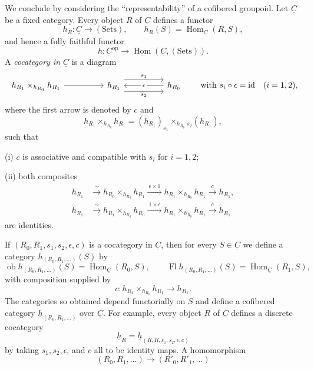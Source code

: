 We conclude by considering the ``representability'' of a cofibered
groupoid. Let $\underline C$ be a fixed category. Every object $R$ of
$\underline C$ defines a functor
\[
 h_R:\underline C\longrightarrow(\mathrm{Sets}),
 \qquad h_R(S)=\operatorname{Hom}_{\underline C}(R,S),
\]
and hence a fully faithful functor
\[
 h:\underline C^{\mathrm{op}}
 \longrightarrow
 \underline{\operatorname{Hom}}(\underline C,(\mathrm{Sets})).
\]
A \emph{cocategory in $\underline C$} is a diagram
\[
\begin{tikzcd}[column sep=huge]
 h_{R_1}\times_{h_{R_0}}h_{R_1} \arrow[r]
 & h_{R_1}
   \arrow[r,shift left=3,"{s_1}"]
   \arrow[r,shift right=3,"{s_2}"']
 & h_{R_0} \arrow[l,"{\epsilon}" description]
\end{tikzcd}
\qquad
\text{with }s_i\circ\epsilon=\operatorname{id}\quad(i=1,2),
\]
where the first arrow is denoted by $c$ and
\[
 h_{R_1}\times_{h_{R_0}}h_{R_1}
 = (h_{R_1})_{s_1}\times_{h_{R_0}}{}_{s_2}(h_{R_1}),
\]
such that

(i) $c$ is associative and compatible with $s_i$ for $i=1,2$;

(ii) both composites
\begin{align*}
 h_{R_1}&\xrightarrow{\ \sim\ }
 h_{R_0}\times_{h_{R_0}}h_{R_1}
 \xrightarrow{\ \epsilon\times1\ }
 h_{R_1}\times_{h_{R_0}}h_{R_1}
 \xrightarrow{\ c\ }h_{R_1},\\[1ex]
 h_{R_1}&\xrightarrow{\ \sim\ }
 h_{R_1}\times_{h_{R_0}}h_{R_0}
 \xrightarrow{\ 1\times\epsilon\ }
 h_{R_1}\times_{h_{R_0}}h_{R_1}
 \xrightarrow{\ c\ }h_{R_1}
\end{align*}
are identities.

If $(R_0,R_1,s_1,s_2,\epsilon,c)$ is a cocategory in
$\underline C$, then for every $S\in\underline C$ we define a
category $h_{(R_0,R_1,\ldots)}(S)$ by
\[
 \operatorname{ob}h_{(R_0,R_1,\ldots)}(S)
   =\operatorname{Hom}_{\underline C}(R_0,S),
 \qquad
 \operatorname{Fl}h_{(R_0,R_1,\ldots)}(S)
   =\operatorname{Hom}_{\underline C}(R_1,S),
\]
with composition supplied by
\[
 c:h_{R_1}\times_{h_{R_0}}h_{R_1}\longrightarrow h_{R_1}.
\]
The categories so obtained depend functorially on $S$ and define a
cofibered category
$\underline h_{(R_0,R_1,\ldots)}$ over $\underline C$. For example,
every object $R$ of $\underline C$ defines a discrete cocategory
\[
 \underline h_R
 =\underline h_{(R,R,s_1,s_2,\epsilon,c)}
\]
by taking $s_1,s_2,\epsilon$, and $c$ all to be identity maps. A
homomorphism
\[
 (R_0,R_1,\ldots)\longrightarrow(R'_0,R'_1,\ldots)
\]


